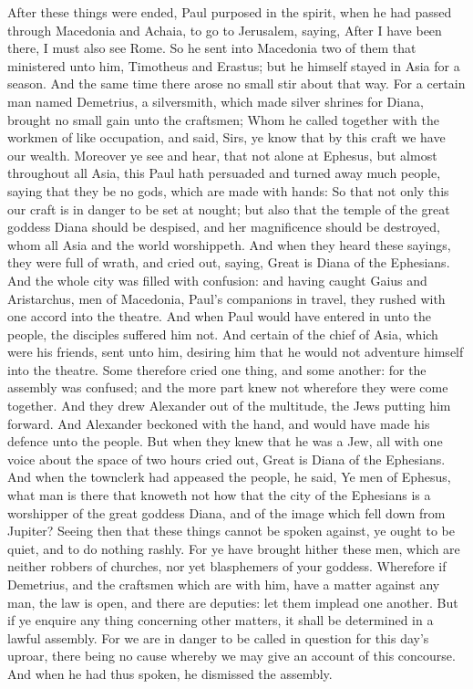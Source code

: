  After these things were ended, Paul purposed in the
spirit, when he had passed through Macedonia and Achaia, to go to
Jerusalem, saying, After I have been there, I must also see Rome.
 So he sent into Macedonia two of them that ministered
unto him, Timotheus and Erastus; but he himself stayed in Asia for a
season.  And the same time there arose no small stir
about that way.  For a certain man named Demetrius, a
silversmith, which made silver shrines for Diana, brought no small gain
unto the craftsmen;  Whom he called together with the
workmen of like occupation, and said, Sirs, ye know that by this craft
we have our wealth.  Moreover ye see and hear, that not
alone at Ephesus, but almost throughout all Asia, this Paul hath
persuaded and turned away much people, saying that they be no gods,
which are made with hands:  So that not only this our
craft is in danger to be set at nought; but also that the temple of the
great goddess Diana should be despised, and her magnificence should be
destroyed, whom all Asia and the world worshippeth.  And
when they heard these sayings, they were full of wrath, and cried out,
saying, Great is Diana of the Ephesians.  And the whole
city was filled with confusion: and having caught Gaius and Aristarchus,
men of Macedonia, Paul's companions in travel, they rushed with one
accord into the theatre.  And when Paul would have
entered in unto the people, the disciples suffered him not.
 And certain of the chief of Asia, which were his
friends, sent unto him, desiring him that he would not adventure himself
into the theatre.  Some therefore cried one thing, and
some another: for the assembly was confused; and the more part knew not
wherefore they were come together.  And they drew
Alexander out of the multitude, the Jews putting him forward. And
Alexander beckoned with the hand, and would have made his defence unto
the people.  But when they knew that he was a Jew, all
with one voice about the space of two hours cried out, Great is Diana of
the Ephesians.  And when the townclerk had appeased the
people, he said, Ye men of Ephesus, what man is there that knoweth not
how that the city of the Ephesians is a worshipper of the great goddess
Diana, and of the image which fell down from Jupiter? 
Seeing then that these things cannot be spoken against, ye ought to be
quiet, and to do nothing rashly.  For ye have brought
hither these men, which are neither robbers of churches, nor yet
blasphemers of your goddess.  Wherefore if Demetrius, and
the craftsmen which are with him, have a matter against any man, the law
is open, and there are deputies: let them implead one another.
 But if ye enquire any thing concerning other matters, it
shall be determined in a lawful assembly.  For we are in
danger to be called in question for this day's uproar, there being no
cause whereby we may give an account of this concourse. 
And when he had thus spoken, he dismissed the assembly.

